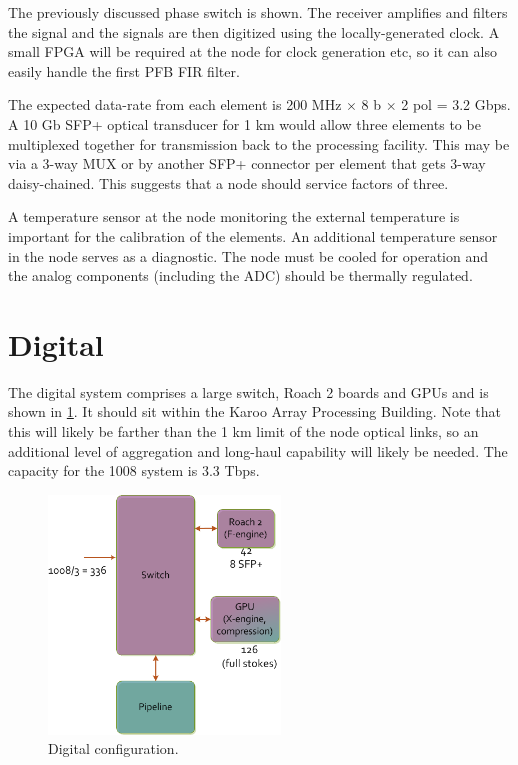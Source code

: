 \documentclass[11pt]{article}
\begin{document}
The previously discussed phase switch is shown.  The receiver amplifies and
filters the signal and the signals are then digitized using the
locally-generated clock.  A small FPGA will be required at the node for clock
generation etc, so it can also easily handle the first PFB FIR filter.

The expected data-rate from each element is 200 MHz $\times$ 8 b $\times$ 2 pol
= 3.2 Gbps.  A 10 Gb SFP+ optical transducer for 1 km would allow three
elements to be multiplexed together for transmission back to the processing
facility.  This may be via a 3-way MUX or by another SFP+ connector per element
that gets 3-way daisy-chained.  This suggests that a node should service
factors of three. 

A temperature sensor at the node monitoring the external temperature is
important for the calibration of the elements.  An additional temperature
sensor in the node serves as a diagnostic.  The node must be cooled for
operation and the analog components (including the ADC) should be thermally
regulated.

\section{Digital}

The digital system comprises a large switch, Roach 2 boards and GPUs and is
shown in \ref{fig:digital}.  It should sit within the Karoo Array Processing
Building.  Note that this will likely be farther than the 1 km limit of the
node optical links, so an additional level of aggregation and long-haul
capability will likely be needed.  The capacity for the 1008 system is 3.3
Tbps.

\begin{figure}[h]
\centering
\includegraphics[width=0.55\textwidth]{plots/Digital.png}
\caption{Digital configuration.}
\label{fig:digital}
\end{figure}
\end{document}
